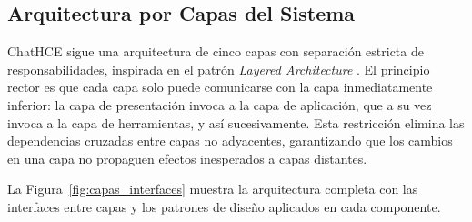 


\subsection{Arquitectura por Capas del Sistema}
\label{sec:arquitectura_capas}

ChatHCE sigue una arquitectura de cinco capas con separación estricta de responsabilidades, inspirada en el patrón \textit{Layered Architecture} \citep{Fowler2002}. El principio rector es que cada capa solo puede comunicarse con la capa inmediatamente inferior: la capa de presentación invoca a la capa de aplicación, que a su vez invoca a la capa de herramientas, y así sucesivamente. Esta restricción elimina las dependencias cruzadas entre capas no adyacentes, garantizando que los cambios en una capa no propaguen efectos inesperados a capas distantes.

La Figura~\ref{fig:capas_interfaces} muestra la arquitectura completa con las interfaces entre capas y los patrones de diseño aplicados en cada componente.


